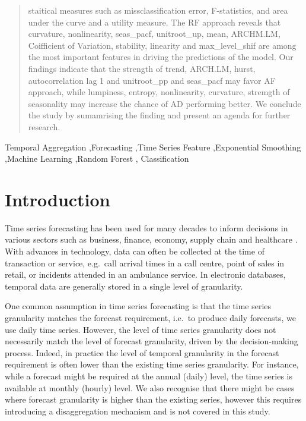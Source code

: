 \documentclass[preprint, 3p,
authoryear]{elsarticle} %
\begin{document}
\begin{frontmatter}
\begin{abstract}
  staitical measures such as missclassification error, F-statistics, and
  area under the curve and a utility measure. The RF approach reveals
  that curvature, nonlinearity, seas\_pacf, unitroot\_up, mean,
  ARCHM.LM, Coifficient of Variation, stability, linearity and
  max\_level\_shif are among the most important features in driving the
  predictions of the model. Our findings indicate that the strength of
  trend, ARCH.LM, hurst, autocorrelation lag 1 and unitroot\_pp and
  seas\_pacf may favor AF approach, while lumpiness, entropy,
  nonlinearity, curvature, stremgth of seasonality may increase the
  chance of AD performing better. We conclude the study by sumamrising
  the finding and present an agenda for further research.
  \end{abstract}
    \begin{keyword}
    Temporal Aggregation \sep Forecasting \sep Time Series
Feature \sep Exponential Smoothing \sep Machine Learning \sep Random
Forest \sep 
    Classification
  \end{keyword}
  
 \end{frontmatter}

\hypertarget{introduction}{%
\section{Introduction}\label{introduction}}

Time series forecasting has been used for many decades to inform
decisions in various sectors such as business, finance, economy, supply
chain and healthcare \citep{petropoulos2022forecasting}. With advances
in technology, data can often be collected at the time of transaction or
service, e.g.~call arrival times in a call centre, point of sales in
retail, or incidents attended in an ambulance service. In electronic
databases, temporal data are generally stored in a single level of
granularity.

One common assumption in time series forecasting is that the time series
granularity matches the forecast requirement, i.e.~to produce daily
forecasts, we use daily time series. However, the level of time series
granularity does not necessarily match the level of forecast
granularity, driven by the decision-making process. Indeed, in practice
the level of temporal granularity in the forecast requirement is often
lower than the existing time series granularity. For instance, while a
forecast might be required at the annual (daily) level, the time series
is available at monthly (hourly) level. We also recognise that there
might be cases where forecast granularity is higher than the existing
series, however this requires introducing a disaggregation mechanism and
is not covered in this study.
\end{document}
